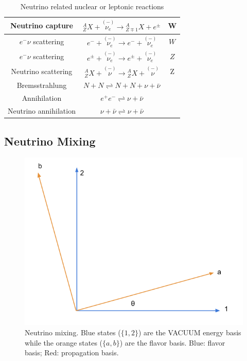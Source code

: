 \documentclass{sciposter}
\begin{document}
\begin{multicols}{3}
\begin{table}[ht]
\begin{tabular}{|c | c | c|}
  Neutrino capture & ${}^A_{Z}X + \overset{(-)}{\nu_e} \to {}^A_{Z\mp 1}X + e^\pm $ & W\\
  [1ex] 
 \hline
 $e^-\nu$ scattering & $e^- + \overset{(-)}{\nu_e} \to e^- + \overset{(-)}{\nu_e} $ &  $W$ \\
 $e^-\nu$ scattering & $e^{\pm} + \overset{(-)}{\nu_e} \to e^{\pm} + \overset{(-)}{\nu_e} $ &  $Z$ \\
 Neutrino scattering & $ {}^A_Z X + \overset{(-)}{\nu} \to {}^A_Z X + \overset{(-)}{\nu} $ &  Z\\
 [0.5ex] 
 \hline
 
 Bremsstrahlung & $N+N\rightleftharpoons N+N + \nu + \bar\nu$ & \\
 Annihilation & $e^+e^- \rightleftharpoons \nu + \bar \nu$   & \\
 Neutrino annihilation & $\nu + \bar \nu  \rightleftharpoons \nu + \bar \nu $   &  \\
 [0.5ex] 
 \hline
 \end{tabular}
 \caption{Neutrino related nuclear or leptonic reactions}
\label{table:Neutrino_Reactions}
\end{table}



\subsection{Neutrino Mixing}

\begin{figure}
\centering
\includegraphics[width=\columnwidth]{assets/neutrinoMixingAngle.png}
\caption{Neutrino mixing. Blue states ($\{1,2\}$) are the VACUUM energy basis while the orange states ($\{a,b\}$) are the flavor basis. Blue: flavor basis; Red: propagation basis.}
\label{fig:neutrinoMixingAngle}
\end{figure}


\end{multicols}
\end{document}
